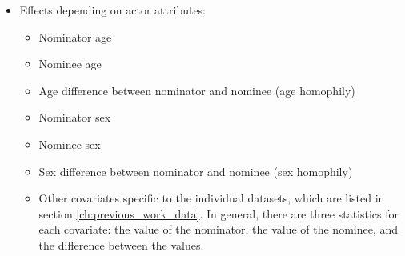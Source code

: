 \begin{itemize}
\begin{itemize}
	\end{itemize}
	\item Effects depending on actor attributes:
	\begin{itemize}
		\item Nominator age
		\item Nominee age
		\item Age difference between nominator and nominee (age homophily)
		\item Nominator sex
		\item Nominee sex
		\item Sex difference between nominator and nominee (sex homophily)
		\item Other covariates specific to the individual datasets, which are listed in section \ref{ch:previous_work_data}. In general, there are three statistics for each covariate: the value of the nominator, the value of the nominee, and the difference between the values.
	\end{itemize}
\end{itemize}

